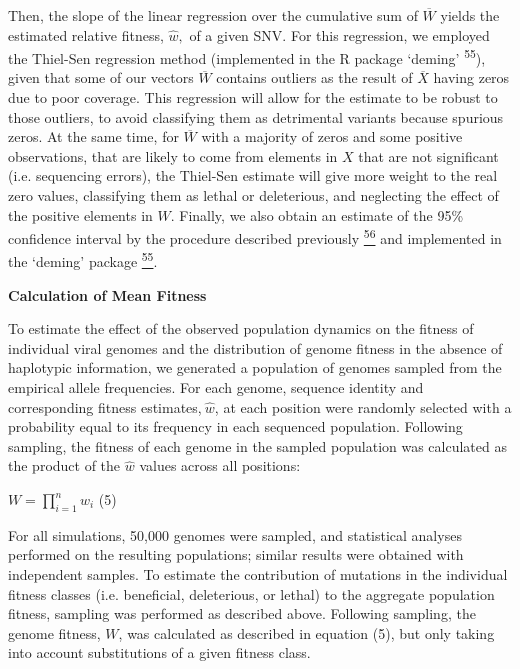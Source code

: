 \documentclass[
]{article}
\begin{document}
Then­, the slope of the linear regression over the cumulative sum of
\(\overline{W}\) yields the estimated relative fitness, \(\widehat{w},\)
of a given SNV.­­ For this regression, we employed the Thiel-Sen
regression method (implemented in the R package `deming'
\textsuperscript{55}), given that some of our vectors \(\overline{W}\)
contains outliers as the result of \(\overline{X}\) having zeros due to
poor coverage. This regression will allow for the estimate to be robust
to those outliers, to avoid classifying them as detrimental variants
because spurious zeros. At the same time, for \(\overline{W}\) with a
majority of zeros and some positive observations, that are likely to
come from elements in \(X\) that are not significant (i.e. sequencing
errors), the Thiel-Sen estimate will give more weight to the real zero
values, classifying them as lethal or deleterious, and neglecting the
effect of the positive elements in \(W\). Finally, we also obtain an
estimate of the 95\% confidence interval by the procedure described
previously
\href{https://paperpile.com/c/REZjPf/xDHhy}{\textsuperscript{56}} and
implemented in the `deming' package
\href{https://paperpile.com/c/REZjPf/TJLiW}{\textsuperscript{55}}.

\textbf{Calculation of Mean Fitness}

To estimate the effect of the observed population dynamics on the
fitness of individual viral genomes and the distribution of genome
fitness in the absence of haplotypic information, we generated a
population of genomes sampled from the empirical allele frequencies. For
each genome, sequence identity and corresponding fitness
estimates,\(\ \widehat{w}\), at each position were randomly selected
with a probability equal to its frequency in each sequenced population.
Following sampling, the fitness of each genome in the sampled population
was calculated as the product of the \(\widehat{w}\) values across all
positions:

\(W = \prod_{i = 1}^{n}{\widehat{w}}_{i}\) (5)

For all simulations, 50,000 genomes were sampled, and statistical
analyses performed on the resulting populations; similar results were
obtained with independent samples. To estimate the contribution of
mutations in the individual fitness classes (i.e. beneficial,
deleterious, or lethal) to the aggregate population fitness, sampling
was performed as described above. Following sampling, the genome
fitness, \(W\), was calculated as described in equation (5), but only
taking into account substitutions of a given fitness class.
\end{document}
